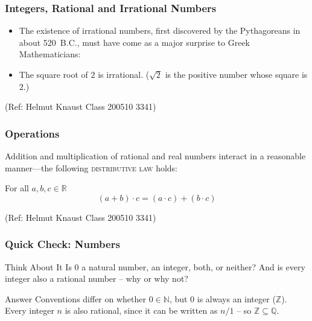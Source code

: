  \begin{frame}[fragile]\frametitle{Integers, Rational and Irrational Numbers}
\begin{itemize}
\item The existence of irrational numbers, first discovered by
the Pythagoreans in about 520~B.C.,  must have come as a major
surprise to Greek Mathematicians:
\item The
square root of $2$ is irrational. ($\sqrt{2}$ is the positive
number whose square is $2$.)

\end{itemize}

\tiny{(Ref: Helmut Knaust Class 200510 3341)}

\end{frame}


 \begin{frame}[fragile]\frametitle{Operations}
 
 Addition and multiplication of rational and real numbers interact
in a reasonable manner---the following \textsc{distributive law}
holds:

For all $a,b,c \in \mathbb{R}$
\[(a+b)\cdot c= (a\cdot c) + (b\cdot c)\]


\tiny{(Ref: Helmut Knaust Class 200510 3341)}

\end{frame}

\begin{frame}[fragile]\frametitle{Quick Check: Numbers}
\begin{block}{Think About It}
Is 0 a natural number, an integer, both, or neither? And is every integer also a rational number -- why or why not?
\end{block}
\pause
\begin{block}{Answer}
Conventions differ on whether $0 \in \mathbb{N}$, but $0$ is always an integer ($\mathbb{Z}$). Every integer $n$ is also rational, since it can be written as $n/1$ -- so $\mathbb{Z} \subseteq \mathbb{Q}$.
\end{block}
\end{frame}